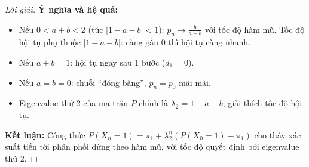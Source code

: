 \documentclass[8pt,a4paper]{article}
\newenvironment{solution}{\begin{proof}[Lời giải]}{\end{proof}}
\begin{document}
\begin{solution}
\textbf{Ý nghĩa và hệ quả:}
\begin{itemize}[nosep]
  \item Nếu $0 < a+b < 2$ (tức $|1-a-b| < 1$): $p_n \to \frac{b}{a+b}$ với tốc độ hàm mũ. Tốc độ hội tụ phụ thuộc $|1-a-b|$: càng gần 0 thì hội tụ càng nhanh.
  \item Nếu $a+b = 1$: hội tụ ngay sau 1 bước ($d_1 = 0$).
  \item Nếu $a = b = 0$: chuỗi ``đóng băng'', $p_n = p_0$ mãi mãi.
  \item Eigenvalue thứ 2 của ma trận $P$ chính là $\lambda_2 = 1-a-b$, giải thích tốc độ hội tụ.
\end{itemize}

\textbf{Kết luận:} Công thức $P(X_n=1) = \pi_1 + \lambda_2^n(P(X_0=1) - \pi_1)$ cho thấy xác suất tiến tới phân phối dừng theo hàm mũ, với tốc độ quyết định bởi eigenvalue thứ 2.
\end{solution}
\end{document}
